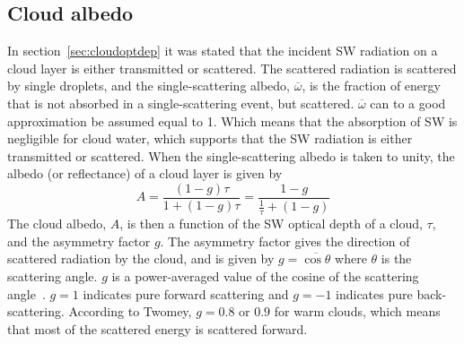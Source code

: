 \subsection{Cloud albedo}
In section~\ref{sec:cloudoptdep} it was stated that the incident SW radiation on a cloud layer is either transmitted or scattered. The scattered radiation is scattered by single droplets, and the single-scattering albedo, $\overline{\omega}$, is the fraction of energy that is not absorbed in a single-scattering event, but scattered. $\overline{\omega}$ can to a good approximation be assumed equal to 1. Which means that the absorption of SW is negligible for cloud water, which supports that the SW radiation is either transmitted or scattered. When the single-scattering albedo is taken to unity, the albedo (or reflectance) of a cloud layer is given by~\citep{Hobbs1993}%
\begin{equation}
A = \frac{(1-g)\tau}{1+(1-g)\tau} = \frac{1-g}{\frac{1}{\tau}+(1-g)}
\label{eqn:cloudalbedo}
\end{equation}
The cloud albedo, $A$, is then a function of the SW optical depth of a cloud, $\tau$, and the asymmetry factor $g$. The asymmetry factor gives the direction of scattered radiation by the cloud, and is given by $g=\overline{\cos \theta}$ where $\theta$ is the scattering angle. $g$ is a power-averaged value of the cosine of the scattering angle~\citep{Twomey1974}. $g=1$ indicates pure forward scattering and $g=-1$ indicates pure back-scattering. According to Twomey, $g=0.8$ or $0.9$ for warm clouds, which means that most of the scattered energy is scattered forward.




